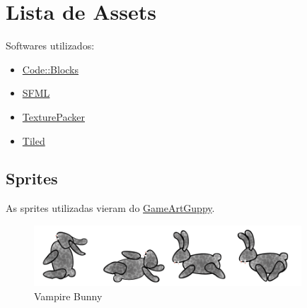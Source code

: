 \documentclass[12pt]{article}
\begin{document}
\section{Lista de Assets}

Softwares utilizados:

\begin{itemize}
  \item \href{http://www.codeblocks.org/}{Code::Blocks}
  \item \href{http://www.sfml-dev.org/}{SFML}
  \item \href{https://www.codeandweb.com/texturepacker}{TexturePacker}
  \item \href{http://www.mapeditor.org/}{Tiled}
\end{itemize}

\subsection{Sprites}
\label{sub:Sprites}

As sprites utilizadas vieram do
\href{http://www.gameartguppy.com/}{GameArtGuppy}.

\begin{figure}[H]
        \centering
        \includegraphics[width=100mm]{bunny.png}
        \caption{Vampire Bunny}
        \label{bu}
\end{figure}
\end{document}
